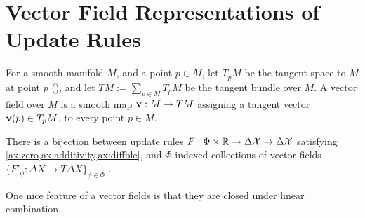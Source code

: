 \documentclass{article}
\begin{document}
\bigskip






\section{Vector Field Representations of Update Rules}
For a smooth manifold $M$, and a point $p \in M$, let $T_p M$ be the tangent space to $M$ at point $p$ (\cite{leesmoothmanifolds}), and let
$TM := \sum_{p \in M} T_p M$
be the tangent bundle over $M$.
A vector field over $M$ is a smooth map $\mathbf{v} : M \to T M$ assigning a tangent vector $\mathbf{v}(p) \in T_p M$, to every point $p \in M$. 

\begin{theorem}
    There is a bijection between
    update rules $F : \Phi \times \mathbb R \to \Delta \mathcal X \to \Delta \mathcal X$
        satisfying \cref{ax:zero,ax:additivity,ax:diffble}, 
    and $\Phi$-indexed collections of vector fields 
        $\{ F'_\phi : \Delta X \to T \Delta X \}_{\phi \in \Phi}$%
    .
\end{theorem}

One nice feature of a vector fields is that they are closed under linear combination.  

\end{document}
